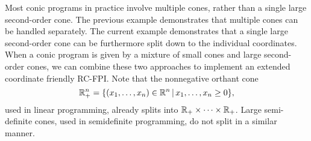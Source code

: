 \documentclass[10pt,mathserif]{beamer}
\begin{document}

\begin{frame}
Most conic programs in practice involve multiple cones, rather than a single large second-order cone.
The previous example demonstrates that multiple cones can be handled separately.
The current example demonstrates that a single large second-order cone can be furthermore split down to the individual coordinates.
When a conic program is given by a mixture of small cones and large second-order cones, we can combine these two approaches to implement an extended coordinate friendly RC-FPI.
Note that the nonnegative orthant cone
\[
\mathbb{R}^n_+=\{(x_1,\dots,x_n)\in \mathbb{R}^n\,|\,x_1,\dots,x_n\ge 0\},
\]
used in linear programming, already splits into $\mathbb{R}_+\times\cdots\times\mathbb{R}_+$.
Large semi-definite cones, used in semidefinite programming, do not split in a similar manner.
\end{frame}

\fi
\end{document}
